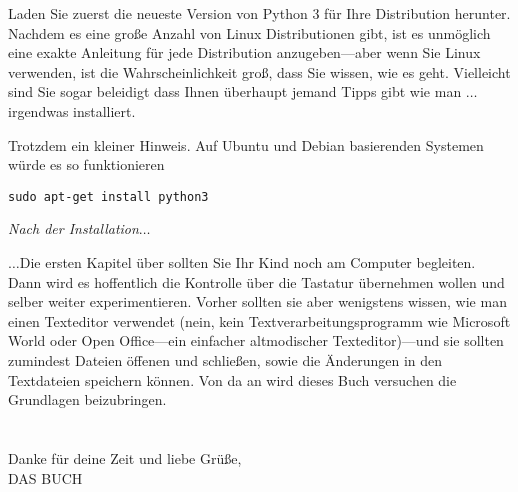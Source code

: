\begin{LINUX}

\noindent
Laden Sie zuerst die neueste Version von Python 3 für Ihre Distribution herunter. Nachdem es eine große Anzahl von Linux Distributionen gibt, ist es unmöglich eine exakte Anleitung für jede Distribution anzugeben---aber wenn Sie Linux verwenden, ist die Wahrscheinlichkeit groß, dass Sie wissen, wie es geht. Vielleicht sind Sie sogar beleidigt dass Ihnen überhaupt jemand Tipps gibt wie man $\ldots$irgendwas installiert.

\noindent
Trotzdem ein kleiner Hinweis. Auf Ubuntu und Debian basierenden Systemen würde es so funktionieren

\begin{listing}
\begin{verbatim}
sudo apt-get install python3
\end{verbatim}
\end{listing}
\end{LINUX}

\noindent
\emph{\color{BrickRed}Nach der Installation$\ldots$}

\noindent
$\ldots$Die ersten Kapitel über sollten Sie Ihr Kind noch am Computer begleiten. Dann wird es hoffentlich die Kontrolle über die Tastatur übernehmen wollen und selber weiter experimentieren. Vorher sollten sie aber wenigstens wissen, wie man einen Texteditor verwendet (nein, kein Textverarbeitungsprogramm wie Microsoft World oder Open Office---ein einfacher altmodischer Texteditor)---und sie sollten zumindest Dateien öffenen und schließen, sowie die Änderungen in den Textdateien speichern können. Von da an wird dieses Buch versuchen die Grundlagen beizubringen. 
\\
\\
\noindent\\
Danke für deine Zeit und liebe Grüße,
\noindent\\
DAS BUCH

